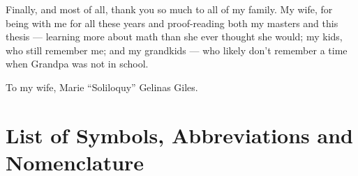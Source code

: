 \documentclass{ucalgthes1}
\begin{document}
Finally, and most of all, thank you so much to all of my family. My wife, for being with me for all
these years and proof-reading both my masters and this thesis --- learning more about math than she
ever thought she would; my kids, who still remember me; and my grandkids --- who likely don't remember a time
when Grandpa was not in school.
\newpage
{}
{}
\vspace{3in}
\begin{flushright}
To my wife, Marie ``Soliloquy'' Gelinas Giles.
\end{flushright}


\begin{singlespace}
\newpage
{}
\tableofcontents
\pagestyle{plain}
\newpage
{}
\listoftables
\pagestyle{plain}
\newpage
{}
\listoffigures
\pagestyle{plain}
\clearpage
\clearpage          %
\end{singlespace}
\newpage
{}
\chapter*{\bf{List of Symbols, Abbreviations and Nomenclature}\hfill} 
\listofsymbols















\begin{singlespace}


\end{singlespace}
\appendix
%
\end{document}
